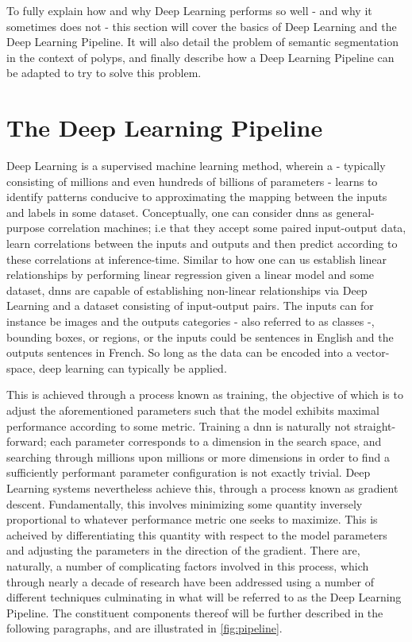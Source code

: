 To fully explain how and why Deep Learning performs so well - and why it sometimes does not - this section will cover the basics of Deep Learning and the Deep Learning Pipeline. It will also detail the problem of semantic segmentation in the context of polyps, and finally describe how a Deep Learning Pipeline can be adapted to try to solve this problem.

\section{The Deep Learning Pipeline}
    Deep Learning is a supervised machine learning method, wherein a  - typically consisting of millions and even hundreds of billions of parameters - learns to identify patterns conducive to approximating the mapping between the inputs and labels in some dataset. Conceptually, one can consider \glspl{dnn} as general-purpose correlation machines; i.e that they accept some paired input-output data, learn correlations between the inputs and outputs and then predict according to these correlations at inference-time. Similar to how one can us establish linear relationships by performing linear regression given a linear model and some dataset, \glspl{dnn} are capable of establishing non-linear relationships via Deep Learning and a dataset consisting of input-output pairs. The inputs can for instance be images and the outputs categories - also referred to as classes -, bounding boxes, or regions, or the inputs could be sentences in English and the outputs sentences in French. So long as the data can be encoded into a vector-space, deep learning can typically be applied. 
    
    This is achieved through a process known as training, the objective of which is to adjust the aforementioned parameters such that the model exhibits maximal performance according to some metric. Training a \gls{dnn} is naturally not straight-forward; each parameter corresponds to a dimension in the search space, and searching through millions upon millions or more dimensions in order to find a sufficiently performant parameter configuration is not exactly trivial. Deep Learning systems nevertheless achieve this, through a process known as gradient descent. Fundamentally, this involves minimizing some quantity inversely proportional to whatever performance metric one seeks to maximize. This is acheived by differentiating this quantity with respect to the model parameters and adjusting the parameters in the direction of the gradient. There are, naturally, a number of complicating factors involved in this process, which through nearly a decade of research have been addressed using a number of different techniques culminating in what will be referred to as the Deep Learning Pipeline. The constituent components thereof will be further described in the following paragraphs, and are illustrated in \autoref{fig:pipeline}. 
    
